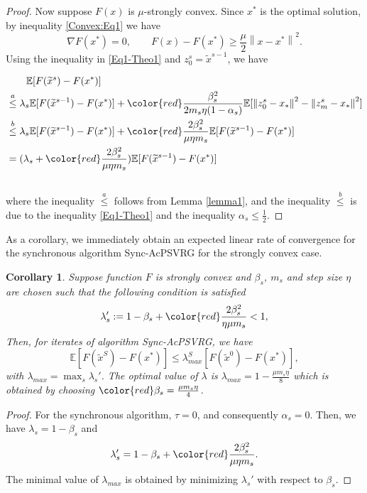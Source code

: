 \documentclass[10pt, conference, compsocconf]{IEEEtran}
\newcommand*{\E}{\mathbb{E}}
\newcommand{\norm}[1]{\left\lVert#1\right\rVert}
\newtheorem{corollary}[theorem]{Corollary}
\theoremstyle{definition}
\theoremstyle{remark}
\begin{document}
\begin{proof}
Now suppose $F(x)$ is $\mu$-strongly convex. Since $x^*$ is the optimal solution, by inequality \eqref{Convex:Eq1} we have 
\begin{equation}\label{Eq1-Theo1}
\nabla F(x^*) = 0,\qquad F(x)-F(x^*) \geq \frac{\mu}{2} \norm{x-x^*}^2.
\end{equation}
Using the inequality in \eqref{Eq1-Theo1} and $z_0^s = \widetilde{x}^{s-1}$, we have 

\begin{equation}
\begin{split}
&\qquad\E [F(\widetilde{x}^s)-F(x^*)]\\
&\stackrel{a}{\leq}\lambda_s\E[F(\widetilde{x}^{s-1})-F(x^*)]+ {\color{red}\frac{ \beta_s^2}{2 m_s\eta(1-\alpha_s)}}\E[\norm{z_{0}^s-x_*}^2-\norm{z_{m}^s-x_*}^2]\\
&\stackrel{b}{\leq}\lambda_s\E[F(\widetilde{x}^{s-1})-F(x^*)]+ {\color{red}\frac{2  \beta_s^2}{\mu\eta m_s}}\E[F(\widetilde{x}^{s-1})-F(x^*)]\\
&=(\lambda_s+{\color{red}\frac{2  \beta_s^2}{\mu\eta m_s}})\E[F(\widetilde{x}^{s-1})-F(x^*)]
\end{split}
\end{equation}\\
where the inequality $\stackrel{a}{\leq}$ follows from Lemma \ref{lemma1}, and the inequality $\stackrel{b}{\leq}$ is due to the inequality \eqref{Eq1-Theo1} and the inequality $\alpha_s\leq \frac{1}{2}$. 
\end{proof}
As a corollary, we immediately obtain an expected linear rate of convergence for the synchronous algorithm Sync-AcPSVRG for the strongly convex case.
\begin{corollary}
Suppose function $F$ is strongly convex and $\beta_s$, $m_s$ and step size $\eta$ are chosen
such that the following condition is satisfied
\[
\lambda_s' := 1-\beta_s+{\color{red}\frac{2\beta_s^2}{\eta\mu m_s}} < 1,
\]
Then, for iterates of algorithm Sync-AcPSVRG, we have
\begin{equation}
\E\left[F(\widetilde{x}^S)-F(x^*)\right]\leq \lambda_{max}^S\left[F(\widetilde{x}^0)-F(x^*)\right], 
\end{equation}
with $\lambda_{max} = \max_{s}{\lambda_s'}$. The optimal value of $\lambda$ is $\lambda_{max} = 1-\frac{\mu m_s\eta}{8}$ which is obtained by choosing ${\color{red}\beta_s=\frac{\mu m_s\eta}{4}}$.
\end{corollary}
\begin{proof}
For the synchronous algorithm, $\tau=0$, and consequently $\alpha_s=0$. Then, we have $\lambda_s = 1-\beta_s$ and 
\[
\lambda_s' = 1-\beta_s+{\color{red}\frac{2  \beta_s^2}{\mu\eta m_s}}.\]
The minimal value of $\lambda_{max}$ is obtained by minimizing $\lambda_s'$ with respect to $\beta_s$.
\end{proof}
\end{document}
